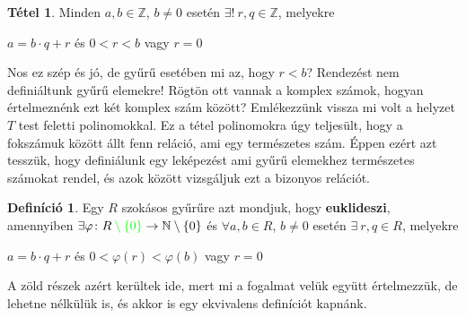 \documentclass[12pt]{book}
\theoremstyle{plain} %
\theoremstyle{definition} %
\newtheorem{defi/}{Definíció}[section]
\newenvironment{defi}
  {\renewcommand{\qedsymbol}{$\clubsuit$}%
   \pushQED{\qed}\begin{defi/}}
  {\popQED\end{defi/}}
\newtheorem{theo/}{Tétel}[section]
\newenvironment{theo}
  {\renewcommand{\qedsymbol}{$\clubsuit$}%
   \pushQED{\qed}\begin{theo/}}
  {\popQED\end{theo/}}
\theoremstyle{remark}
\renewcommand\qedsymbol{$\blacksquare$}
\numberwithin{equation}{section}  %
\begin{document}
	\begin{theo}
		Minden $a,b\in \mathbb{Z}$, $b\neq 0$ esetén $\exists!\ r,q\in \mathbb{Z}$, melyekre
		\begin{center}
			$a=b\cdot q +r$ \hspace{2cm} és \hspace{2cm} $0<r<b$ \hspace{0.5cm} vagy \hspace{0.5cm} $r=0$
		\end{center}
	\end{theo}
	Nos ez szép és jó, de gyűrű esetében mi az, hogy $r<b$? Rendezést nem definiáltunk gyűrű elemekre! Rögtön ott vannak a komplex számok, hogyan értelmeznénk ezt két komplex szám között? Emlékezzünk vissza mi volt a helyzet $T$ test feletti polinomokkal. Ez a tétel polinomokra úgy teljesült, hogy a fokszámuk között állt fenn reláció, ami egy természetes szám. Éppen ezért azt tesszük, hogy definiálunk egy leképezést ami gyűrű elemekhez természetes számokat rendel, és azok között vizsgáljuk ezt a bizonyos relációt.
	\begin{defi}\label{euklgy}
		Egy $R$ szokásos gyűrűre azt mondjuk, hogy \textbf{euklideszi}, amennyiben \newline $\exists \varphi\colon R\color{green}\setminus \{0\}\color{black} \to \mathbb{N}\setminus \{0\}$ és $\forall a,b\in R$, $b\neq 0$ esetén $\exists\ r,q\in R$, melyekre
		\begin{center}
			$a=b\cdot q +r$ \hspace{1cm} és \hspace{1cm} $0<\varphi(r)<\varphi(b)$ \hspace{0.25cm} vagy \color{green}\hspace{0.25cm} $r=0$
		\end{center}
	\end{defi}
	A zöld részek azért kerültek ide, mert mi a fogalmat velük együtt értelmezzük, de lehetne nélkülük is, és akkor is egy ekvivalens definíciót kapnánk.
	
\end{document}
